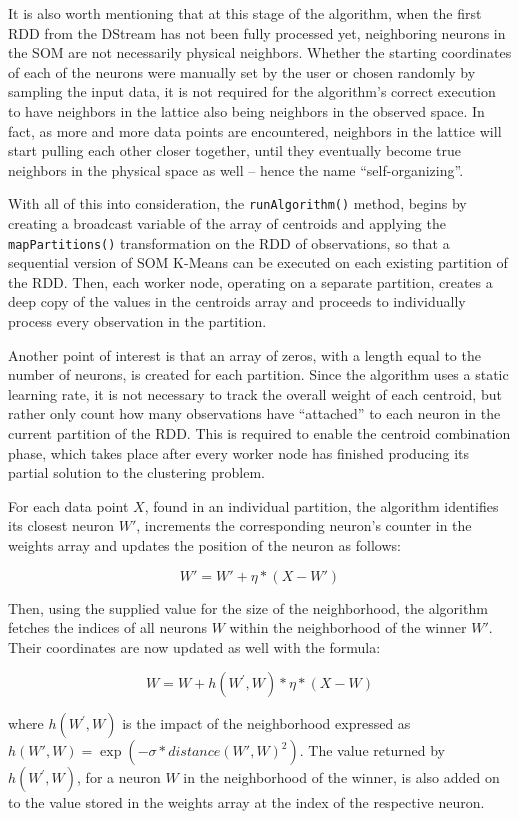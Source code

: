 \documentclass{l4proj}
\begin{document}
It is also worth mentioning that at this stage of the algorithm, when the first RDD from the DStream has not been fully processed yet, neighboring neurons in the SOM are not necessarily physical neighbors. Whether the starting coordinates of each of the neurons were manually set by the user or chosen randomly by sampling the input data, it is not required for the algorithm's correct execution to have neighbors in the lattice also being neighbors in the observed space. In fact, as more and more data points are encountered, neighbors in the lattice will start pulling each other closer together, until they eventually become true neighbors in the physical space as well -- hence the name ``self-organizing''.

With all of this into consideration, the \texttt{runAlgorithm()} method, begins by creating a broadcast variable of the array of centroids and applying the \texttt{mapPartitions()} transformation on the RDD of observations, so that a sequential version of SOM K-Means can be executed on each existing partition of the RDD. Then, each worker node, operating on a separate partition, creates a deep copy of the values in the centroids array and proceeds to individually process every observation in the partition. 

Another point of interest is that an array of zeros, with a length equal to the number of neurons, is created for each partition. Since the algorithm uses a static learning rate, it is not necessary to track the overall weight of each centroid, but rather only count how many observations have ``attached'' to each neuron in the current partition of the RDD. This is required to enable the centroid combination phase, which takes place after every worker node has finished producing its partial solution to the clustering problem.

For each data point $X$, found in an individual partition, the algorithm identifies its closest neuron $W'$, increments the corresponding neuron's counter in the weights array and updates the position of the neuron as follows:

$$W' = W' + \eta*(X-W')$$

\noindent Then, using the supplied value for the size of the neighborhood, the algorithm fetches the indices of all neurons $W$ within the neighborhood of the winner $W'$. Their coordinates are now updated as well with the formula:

$$W = W + h(W^{\prime},W)*\eta*(X-W)$$

\noindent where $h(W^{\prime},W)$ is the impact of the neighborhood expressed as $h(W',W) = \exp(-\sigma*distance(W', W)^2)$. The value returned by $h(W^{\prime},W)$, for a neuron $W$ in the neighborhood of the winner, is also added on to the value stored in the weights array at the index of the respective neuron.
\end{document}
